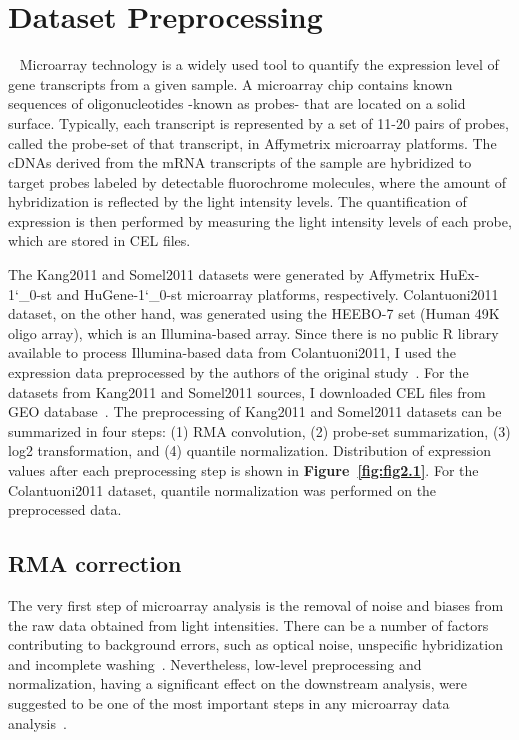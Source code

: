 \section{Dataset Preprocessing}~\label{sec:dset.preprocess}
Microarray technology is a widely used tool to quantify the expression level of gene transcripts from a given sample. 
A microarray chip contains known sequences of oligonucleotides -known as probes- that are located on a solid surface.
Typically, each transcript is represented by a set of 11-20 pairs of probes, called the probe-set of that transcript, in Affymetrix microarray platforms.
The cDNAs derived from the mRNA transcripts of the sample are hybridized to target probes labeled by detectable fluorochrome molecules, 
where the amount of hybridization is reflected by the light intensity levels.
The quantification of expression is then performed by measuring the light intensity levels of each probe, which are stored in CEL files.

The Kang2011 and Somel2011 datasets were generated by Affymetrix HuEx-1\char`_0-st and HuGene-1\char`_0-st microarray platforms, respectively. 
Colantuoni2011 dataset, on the other hand, was generated using the HEEBO-7 set (Human 49K oligo array), which is an Illumina-based array. 
Since there is no public R library available to process Illumina-based data from Colantuoni2011, 
I used the expression data preprocessed by the authors of the original study~\cite{Colantuoni2011}. 
For the datasets from Kang2011 and Somel2011 sources, I downloaded CEL files from GEO database~\cite{Barrett2013}. 
The preprocessing of Kang2011 and Somel2011 datasets can be summarized in four steps: (1) RMA convolution, (2) probe-set summarization,
(3) log2 transformation, and (4) quantile normalization. 
Distribution of expression values after each preprocessing step is shown in \textbf{Figure~\ref{fig:fig2.1}}.
For the Colantuoni2011 dataset, quantile normalization was performed on the preprocessed data.

\subsection{RMA correction}
The very first step of microarray analysis is the removal of noise and biases from the raw data obtained from light intensities.
There can be a number of factors contributing to background errors, such as optical noise, unspecific hybridization and incomplete washing~\cite{Bengtsson2006}. 
Nevertheless, low-level preprocessing and normalization, having a significant effect on the downstream analysis, 
were suggested to be one of the most important steps in any microarray data analysis~\cite{Bengtsson2006}.

